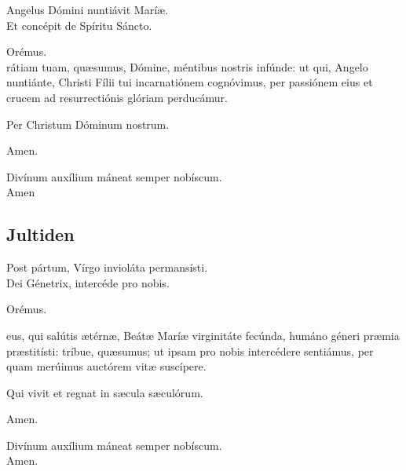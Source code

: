 \va Angelus Dómini nuntiávit Maríæ.\\
\ra Et concépit de Spíritu Sáncto.

\medskip
{}

\medskip
Orémus.\\

\medskip
{} rátiam tuam, qu\ae sumus, Dómine, méntibus nostris infúnde: ut
qui, Angelo nuntiánte, Christi Fílii tui incarnatiónem cognóvimus,
per passiónem eius et crucem ad resurrectiónis glóriam
perducámur.

Per Christum Dóminum nostrum.

\medskip
\ra Amen.

\medskip
\va Divínum auxílium máneat semper nobíscum.\\
\ra Amen

\bigskip
\subsection{Jultiden}

\va Post pártum, Vírgo invioláta permansísti.\\
\ra Dei Génetrix, intercéde pro nobis.

\medskip
{}

\medskip
Orémus.

\medskip
{} eus, qui salútis ætérnæ, Beátæ Maríæ virginitáte fecúnda, humáno
géneri pr\ae mia præstitísti: tríbue, qu\ae sumus; ut ipsam
pro nobis intercédere sentiámus, per quam merúimus auctórem
vitæ suscípere. 

Qui vivit et regnat in s\ae cula sæculórum.

\medskip
\ra Amen.

\medskip
\va Divínum auxílium máneat semper nobíscum.\\
\ra Amen.

